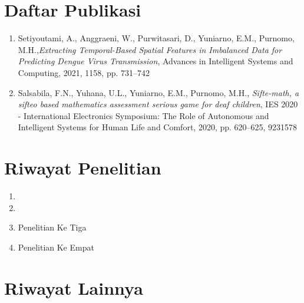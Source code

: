 \section*{Daftar Publikasi}

\begin{enumerate}
	\item Setiyoutami, A., Anggraeni, W., Purwitasari, D., Yuniarno, E.M., Purnomo, M.H.,\textit{Extracting Temporal-Based Spatial Features in Imbalanced Data for Predicting Dengue Virus Transmission},
	Advances in Intelligent Systems and Computing, 2021, 1158, pp. 731–742
	\item Salsabila, F.N., Yuhana, U.L., Yuniarno, E.M., Purnomo, M.H., \textit{Sifte-math, a sifteo based mathematics assessment serious game for deaf children}, IES 2020 - International Electronics Symposium: The Role of Autonomous and Intelligent Systems for Human Life and Comfort, 2020, pp. 620–625, 9231578
	
	
\end{enumerate}

\section*{Riwayat Penelitian}
\begin{enumerate}
	\item \lipsum[3]
	\item \lipsum[3]
	\item Penelitian Ke Tiga 
	\item Penelitian Ke Empat 
\end{enumerate}
\section*{Riwayat Lainnya}

\lipsum[1]